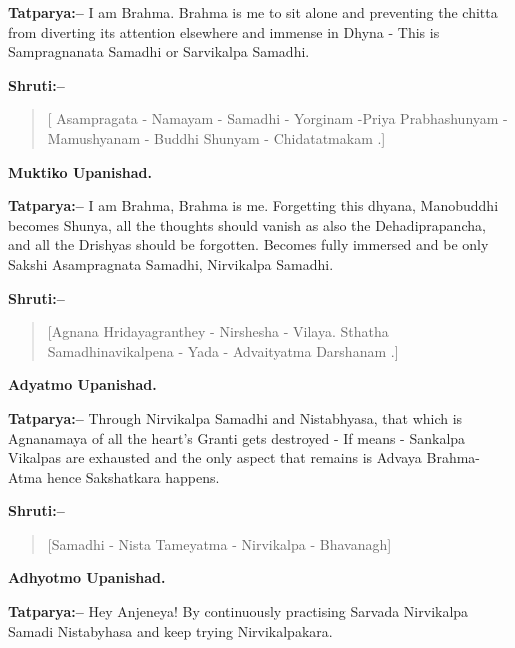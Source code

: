 \textbf{Tatparya:–} I am Brahma. Brahma is me to sit alone and preventing the chitta from diverting its attention elsewhere and immense in Dhyna - This is Sampragnanata Samadhi or Sarvikalpa Samadhi.

\textbf{Shruti:–}

\begin{verse}
[ Asampragata - Namayam - Samadhi - Yorginam -\break Priya  Prabhashunyam - Mamushyanam - Buddhi Shunyam - Chidatatmakam .]
\end{verse}

\begin{flushright}
\textbf{Muktiko Upanishad.}
\end{flushright}

\textbf{Tatparya:–} I am Brahma, Brahma is me. Forgetting this dhyana, Manobuddhi becomes Shunya, all the thoughts should vanish as also the Dehadiprapancha, and all the Drishyas should be forgotten. Becomes fully immersed and be only Sakshi Asampragnata Samadhi, Nirvikalpa Samadhi.

\textbf{Shruti:–}

\begin{verse}
[Agnana Hridayagranthey - Nirshesha - Vilaya. Sthatha \\ Samadhinavikalpena - Yada - Advaityatma Darshanam .]
\end{verse}

\begin{flushright}
\textbf{Adyatmo Upanishad.}
\end{flushright}

\textbf{Tatparya:–} Through Nirvikalpa Samadhi and Nistabhyasa, that which is Agnanamaya of all the heart's Granti gets destroyed - If means - Sankalpa Vikalpas are exhausted and the only aspect that remains is Advaya Brahma-Atma hence Sakshatkara happens.

\newpage

\textbf{Shruti:–}

\begin{verse}
[Samadhi - Nista Tameyatma - Nirvikalpa - Bhavanagh]
\end{verse}

\begin{flushright}
\textbf{Adhyotmo Upanishad.}
\end{flushright}

\textbf{Tatparya:–} Hey Anjeneya! By continuously practising Sarvada Nirvikalpa Samadi Nistabyhasa and keep trying Nirvikalpakara.

